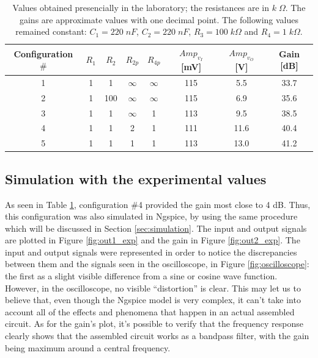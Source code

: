 \begin{table}[H]
    \centering
    \begin{tabular}{|c|c|c|c|c|c|c|c|}
        \hline
        Configuration $\#$ & $R_1$ & $R_2$ & $R_{2p}$ & $R_{4p}$ & $Amp_{v_I}$ [mV] & $Amp_{v_O}$ [V] & Gain [dB]\\
        \hline
        1 & 1 & 1 & $\infty$ & $\infty$ & 115 & 5.5 & 33.7 \\
        2 & 1 & 100 & $\infty$ & $\infty$ & 115 & 6.9 & 35.6 \\
        3 & 1 & 1 & $\infty$ & 1 & 113 & 9.5 & 38.5 \\
        4 & 1 & 1 & 2 & 1 & 111 & 11.6 & 40.4 \\
        5 & 1 & 1 & 1 & 1 & 113 & 13.0 & 41.2 \\
        \hline
    \end{tabular}
    \caption{Values obtained presencially in the laboratory; the resistances are in $k\;\Omega$. The gains are approximate values with one decimal point. The following values remained constant: $C_1=220\;nF$, $C_2=220\;nF$, $R_3=100\;k\Omega$ and $R_4=1\;k\Omega$.}
    \label{tab:lab_results}
\end{table}

\subsection{Simulation with the experimental values}

As seen in Table \ref{tab:lab_results}, configuration $\#$4 provided the gain most close to 4 dB. Thus, this configuration was also simulated in Ngspice, by using the same procedure which will be discussed in Section \ref{sec:simulation}. The input and output signals are plotted in Figure \ref{fig:out1_exp} and the gain in Figure \ref{fig:out2_exp}. The input and output signals were represented in order to notice the discrepancies between them and the signals seen in the oscilloscope, in Figure \ref{fig:oscilloscope}: the first as a slight visible difference from a sine or cosine wave function. However, in the oscilloscope, no visible ``distortion'' is clear. This may let us to believe that, even though the Ngspice model is very complex, it can't take into account all of the effects and phenomena that happen in an actual assembled circuit. As for the gain's plot, it's possible to verify that the frequency response clearly shows that the assembled circuit works as a bandpass filter, with the gain being maximum around a central frequency.


